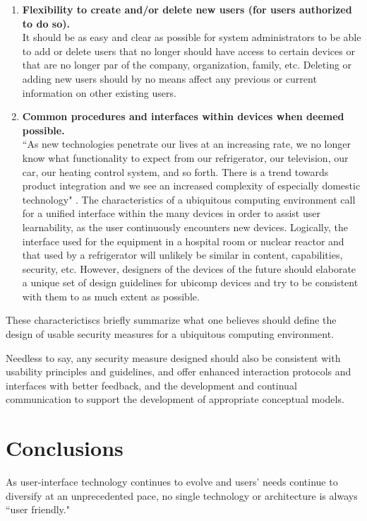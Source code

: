 \documentclass{article}
\begin{document}
\begin{enumerate}
 \item \textbf{Flexibility to create and/or delete new users (for users authorized to do so).}\\
 It should be as easy and clear as possible for system administrators to be able to add or delete users that no longer should have access to certain devices or that are no longer par of the company, organization, family, etc.  Deleting or adding new users should by no means affect any previous or current information on other existing users.

 \item \textbf{Common procedures and interfaces within devices when deemed possible.}\\
 ``As new technologies penetrate our lives at an increasing rate, we no longer know what functionality to expect from our refrigerator, our television, our car, our heating control system, and so forth. There is a trend towards product integration and we see an increased complexity of especially domestic technology" \cite{petersen2002usability}. The characteristics of a ubiquitous computing environment call for a unified interface within the many devices in order to assist user learnability, as the user continuously encounters new devices. Logically, the interface used for the equipment in a hospital room or nuclear reactor and that used by a refrigerator will unlikely be similar in content, capabilities, security, etc. However, designers of the devices of the future should elaborate a unique set of design guidelines for ubicomp devices and try to be consistent with them to as much extent as possible. 
\end{enumerate}

These characterictiscs briefly summarize what one believes should define the design of usable security measures for a ubiquitous computing environment.  

Needless to say, any security measure designed should also be consistent with usability principles and guidelines, and offer enhanced interaction protocols and interfaces with better feedback, and the development and continual communication to support the development of appropriate conceptual models. 


\section{Conclusions}
As user-interface technology continues to evolve and users' needs continue to diversify at an unprecedented pace, no single technology or architecture is always ``user friendly." 
\end{document}
